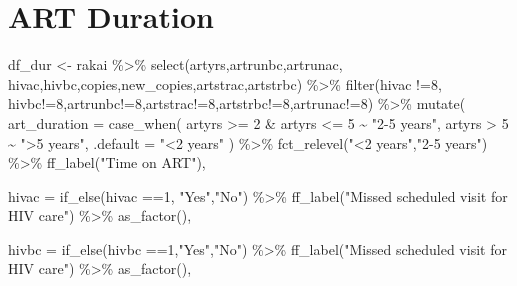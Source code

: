 \documentclass[
  letterpaper,
  DIV=11,
  numbers=noendperiod]{scrartcl}
\newenvironment{Shaded}{\begin{snugshade}}{\end{snugshade}}
\newcommand{\AttributeTok}[1]{\textcolor[rgb]{0.40,0.45,0.13}{#1}}
\newcommand{\DecValTok}[1]{\textcolor[rgb]{0.68,0.00,0.00}{#1}}
\newcommand{\FunctionTok}[1]{\textcolor[rgb]{0.28,0.35,0.67}{#1}}
\newcommand{\NormalTok}[1]{\textcolor[rgb]{0.00,0.23,0.31}{#1}}
\newcommand{\OtherTok}[1]{\textcolor[rgb]{0.00,0.23,0.31}{#1}}
\newcommand{\SpecialCharTok}[1]{\textcolor[rgb]{0.37,0.37,0.37}{#1}}
\newcommand{\StringTok}[1]{\textcolor[rgb]{0.13,0.47,0.30}{#1}}
\begin{document}
\section{ART Duration}\label{art-duration}

\begin{Shaded}
\begin{Highlighting}[]
\NormalTok{df\_dur }\OtherTok{\textless{}{-}}\NormalTok{ rakai }\SpecialCharTok{\%\textgreater{}\%} 
  \FunctionTok{select}\NormalTok{(artyrs,artrunbc,artrunac,}
\NormalTok{         hivac,hivbc,copies,new\_copies,artstrac,artstrbc) }\SpecialCharTok{\%\textgreater{}\%} 
  \FunctionTok{filter}\NormalTok{(hivac }\SpecialCharTok{!=}\DecValTok{8}\NormalTok{, hivbc}\SpecialCharTok{!=}\DecValTok{8}\NormalTok{,artrunbc}\SpecialCharTok{!=}\DecValTok{8}\NormalTok{,artstrac}\SpecialCharTok{!=}\DecValTok{8}\NormalTok{,artstrbc}\SpecialCharTok{!=}\DecValTok{8}\NormalTok{,artrunac}\SpecialCharTok{!=}\DecValTok{8}\NormalTok{) }\SpecialCharTok{\%\textgreater{}\%} 
 \FunctionTok{mutate}\NormalTok{(}
  \AttributeTok{art\_duration =} \FunctionTok{case\_when}\NormalTok{(}
\NormalTok{     artyrs }\SpecialCharTok{\textgreater{}=} \DecValTok{2} \SpecialCharTok{\&}\NormalTok{  artyrs }\SpecialCharTok{\textless{}=} \DecValTok{5} \SpecialCharTok{\textasciitilde{}} \StringTok{"2{-}5 years"}\NormalTok{,}
\NormalTok{    artyrs }\SpecialCharTok{\textgreater{}} \DecValTok{5} \SpecialCharTok{\textasciitilde{}} \StringTok{"\textgreater{}5 years"}\NormalTok{,}
    \AttributeTok{.default =}  \StringTok{"\textless{}2 years"}
\NormalTok{  ) }\SpecialCharTok{\%\textgreater{}\%} 
    \FunctionTok{fct\_relevel}\NormalTok{(}\StringTok{"\textless{}2 years"}\NormalTok{,}\StringTok{"2{-}5 years"}\NormalTok{) }\SpecialCharTok{\%\textgreater{}\%} 
    \FunctionTok{ff\_label}\NormalTok{(}\StringTok{"Time on ART"}\NormalTok{),}
  
    \AttributeTok{hivac =} \FunctionTok{if\_else}\NormalTok{(hivac }\SpecialCharTok{==}\DecValTok{1}\NormalTok{, }\StringTok{"Yes"}\NormalTok{,}\StringTok{"No"}\NormalTok{) }\SpecialCharTok{\%\textgreater{}\%} 
    \FunctionTok{ff\_label}\NormalTok{(}\StringTok{"Missed scheduled visit for HIV care"}\NormalTok{) }\SpecialCharTok{\%\textgreater{}\%} 
      \FunctionTok{as\_factor}\NormalTok{(),}
   
     \AttributeTok{hivbc =} \FunctionTok{if\_else}\NormalTok{(hivbc }\SpecialCharTok{==}\DecValTok{1}\NormalTok{,}\StringTok{"Yes"}\NormalTok{,}\StringTok{"No"}\NormalTok{) }\SpecialCharTok{\%\textgreater{}\%} 
    \FunctionTok{ff\_label}\NormalTok{(}\StringTok{"Missed scheduled visit for HIV care"}\NormalTok{) }\SpecialCharTok{\%\textgreater{}\%} 
    \FunctionTok{as\_factor}\NormalTok{(),}
 

\end{Highlighting}
\end{Shaded}
\end{document}

